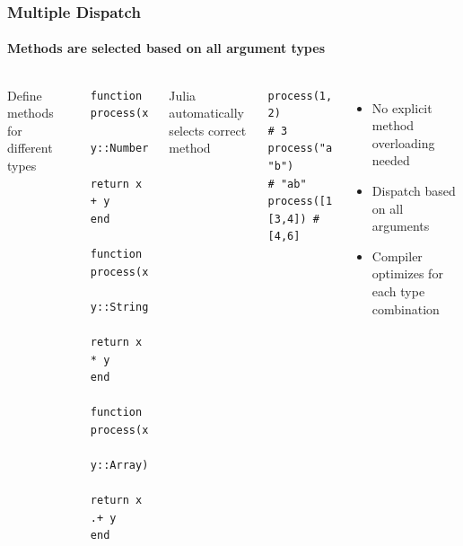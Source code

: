 \documentclass[aspectratio=169]{beamer} %
\begin{document}
\begin{frame}[fragile]
    \frametitle{Multiple Dispatch}
    \framesubtitle{Methods are selected based on all argument types}
    
    \begin{columns}[t]
        Define methods for different types
        \begin{verbatim}
function process(x::Number,
                 y::Number)
    return x + y
end

function process(x::String,
                 y::String)
    return x * y
end

function process(x::Array,
                 y::Array)
    return x .+ y
end
        \end{verbatim}

        Julia automatically selects correct method
        \begin{verbatim}
process(1, 2)         # 3
process("a", "b")     # "ab"
process([1,2], [3,4]) # [4,6]
        \end{verbatim}

        \vspace{0.3cm}
        \begin{itemize}
            \item No explicit method overloading needed
            \item Dispatch based on all arguments
            \item Compiler optimizes for each type combination
        \end{itemize}

    \end{columns}
    

\end{frame}
\end{document}
